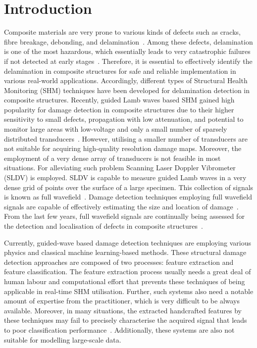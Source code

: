 \section{Introduction}
Composite materials are very prone to various kinds of defects such as cracks, fibre breakage, debonding, and delamination~\cite{ip2004delamination, smith2009composite}. 
Among these defects, delamination is one of the most hazardous, which essentially leads to very catastrophic failures if not detected at early stages~\cite{valdes1999delamination}. 
Therefore, it is essential to effectively identify the delamination in composite structures for safe and reliable implementation in various real-world applications.  
Accordingly, different types of Structural Health Monitoring (SHM) techniques have been developed for delamination detection in composite structures. 
Recently, guided Lamb waves based SHM gained high popularity for damage detection in composite structures due to their higher sensitivity to small defects, propagation with low attenuation, and potential to monitor large areas with low-voltage and only a small number of sparsely distributed transducers~\cite{alleyne1992interaction, giurgiutiu2003lamb, ihn2008pitch, mitra2016guided}. 
However, utilising a smaller number of transducers are not suitable for acquiring high-quality resolution damage maps. 
Moreover, the employment of a very dense array of transducers is not feasible in most situations. 
For alleviating such problem Scanning Laser Doppler Vibrometer (SLDV) is employed. 
SLDV is capable to measure guided Lamb waves in a very dense grid of points over the surface of a large specimen. 
This collection of signals is known as full wavefield~\cite{radzienski2019damage}. 
Damage detection techniques employing full wavefield signals are capable of effectively estimating the size and location of damage~\cite{girolamo2018impact, kudela2018impact}. From the last few years, full wavefield signals are continually being assessed for the detection and localisation of defects in composite structures~\cite{sohn2011delamination, sohn2011automated, rogge2013characterization, kudela2018impact, radzienski2019damage}.

Currently, guided-wave based damage detection techniques are employing various physics and classical machine learning-based methods. 
These structural damage detection approaches are composed of two processes: feature extraction and feature classification. 
The feature extraction process usually needs a great deal of human labour and computational effort that prevents these techniques of being applicable in real-time SHM utilisation. 
Further, such systems also need a notable amount of expertise from the practitioner, which is very difficult to be always available.
Moreover, in many situations, the extracted handcrafted features by these techniques may fail to precisely characterise the acquired signal that leads to poor classification performance~\cite{zhao2019deep, yuan2020machine}. 
Additionally, these systems are also not suitable for modelling large-scale data.

